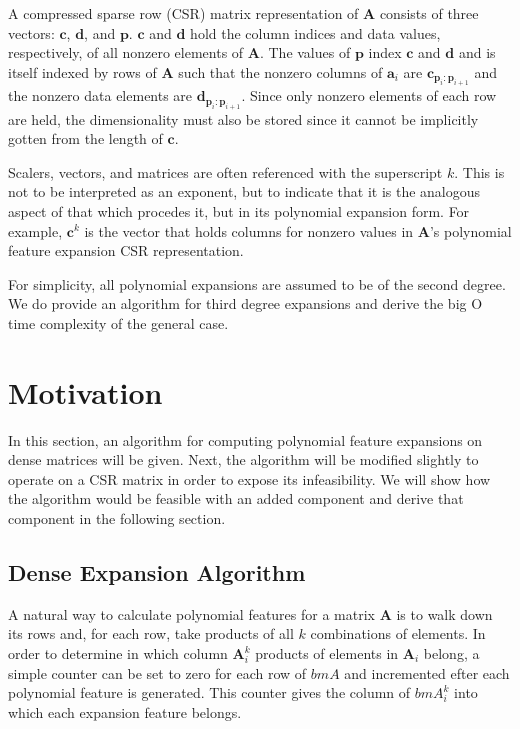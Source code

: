 \documentclass{article} %
\begin{document}
A compressed sparse row (CSR) matrix representation of $\bm{A}$ consists of three vectors: $\bm{c}$, $\bm{d}$, and $\bm{p}$.
$\bm{c}$ and $\bm{d}$ hold the column indices and data values, respectively, of all nonzero elements of $\bm{A}$.
The values of $\bm{p}$ index $\bm{c}$ and $\bm{d}$ and is itself indexed by rows of $\bm{A}$ such that the nonzero columns of $\bm{a}_i$ are $\bm{c}_{\bm{p}_i:\bm{p}_{i+1}}$ and the nonzero data elements are $\bm{d}_{\bm{p}_i:\bm{p}_{i+1}}$.
Since only nonzero elements of each row are held, the dimensionality must also be stored since it cannot be implicitly gotten from the length of $\bm{c}$.

Scalers, vectors, and matrices are often referenced with the superscript $k$.
This is not to be interpreted as an exponent, but to indicate that it is the analogous aspect of that which procedes it, but in its polynomial expansion form.
For example, $\bm{c}^k$ is the vector that holds columns for nonzero values in $\bm{A}$'s polynomial feature expansion CSR representation.

For simplicity, all polynomial expansions are assumed to be of the second degree.
We do provide an algorithm for third degree expansions and derive the big O time complexity of the general case.

\section{Motivation}
In this section, an algorithm for computing polynomial feature expansions on dense matrices will be given.
Next, the algorithm will be modified slightly to operate on a CSR matrix in order to expose its infeasibility.
We will show how the algorithm would be feasible with an added component and derive that component in the following section.

\subsection{Dense Expansion Algorithm}
A natural way to calculate polynomial features for a matrix $\bm{A}$ is to walk down its rows and, for each row, take products of all $k$ combinations of elements.
In order to determine in which column $\bm{A}^k_i$ products of elements in $\bm{A}_i$ belong, a simple counter can be set to zero for each row of $bm{A}$ and incremented efter each polynomial feature is generated.
This counter gives the column of $bm{A}^k_i$ into which each expansion feature belongs.
\end{document}
